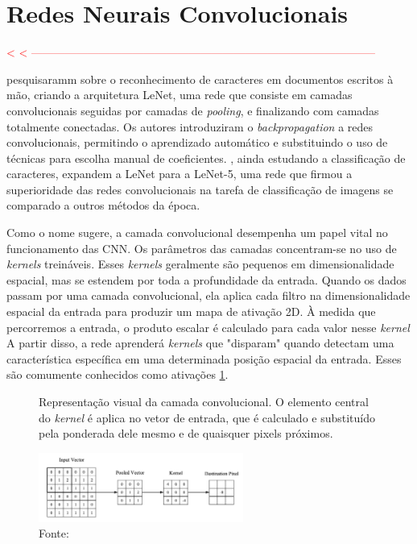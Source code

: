 \section{Redes Neurais Convolucionais}
\label{sec:cnn}

\textcolor{red}{
< < --------------------------------------------------------------------------------------------
}

\cite{lecunHandwrittenDigitRecognition1989} pesquisaramm sobre o reconhecimento de caracteres em documentos escritos à mão, criando a arquitetura LeNet, uma rede que consiste em camadas convolucionais seguidas por camadas de \textit{pooling}, e finalizando com camadas totalmente conectadas. Os autores introduziram o \textit{backpropagation} a redes convolucionais, permitindo o aprendizado automático e substituindo o uso de técnicas para escolha manual de coeficientes. \cite{lecunHandwrittenDigitRecognition1989}, ainda estudando a classificação de caracteres, expandem a LeNet para a LeNet-5, uma rede que firmou a superioridade das redes convolucionais na tarefa de classificação de imagens se comparado a outros métodos da época.

Como o nome sugere, a camada convolucional desempenha um papel vital no funcionamento das \gls{CNN}. Os parâmetros das camadas concentram-se no uso de \textit{kernels} treináveis. Esses \textit{kernels} geralmente são pequenos em dimensionalidade espacial, mas se estendem por toda a profundidade da entrada. Quando os dados passam por uma camada convolucional, ela aplica cada filtro na dimensionalidade espacial da entrada para produzir um mapa de ativação 2D. À medida que percorremos a entrada, o produto escalar é calculado para cada valor nesse \textit{kernel} A partir disso, a rede aprenderá \textit{kernels} que "disparam" quando detectam uma característica específica em uma determinada posição espacial da entrada. Esses são comumente conhecidos como ativações \ref{fig:fig024}.

\begin{figure}[h!]
    \centering
    \caption{Representação visual da camada convolucional. O elemento central do \textit{kernel} é aplica no vetor de entrada, que é calculado e substituído pela ponderada dele mesmo e de quaisquer pixels próximos.}
    \includegraphics[width=0.6\textwidth]{figures/fig024.png}
    \caption*{Fonte: \cite{osheaIntroductionConvolutionalNeural2015c}}
    \label{fig:fig024}
\end{figure}

